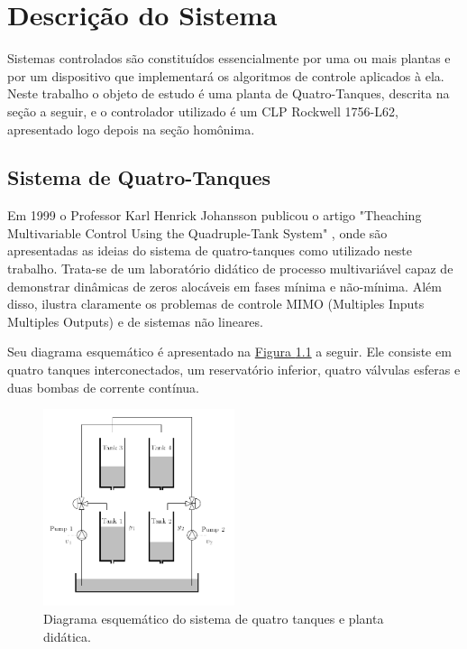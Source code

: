 %

\chapter{Descrição do Sistema} \label{capDescSis}
Sistemas controlados são constituídos essencialmente por uma ou mais plantas e por um dispositivo que implementará os algoritmos de controle aplicados à ela. Neste trabalho o objeto de estudo é uma planta de Quatro-Tanques, descrita na seção a seguir, e o controlador utilizado é um CLP Rockwell 1756-L62, apresentado logo depois na seção homônima.

\section{Sistema de Quatro-Tanques}
Em 1999 o Professor Karl Henrick Johansson publicou o artigo "Theaching Multivariable Control Using the Quadruple-Tank System" \cite{johansson2}, onde são apresentadas as ideias do sistema de quatro-tanques como utilizado neste trabalho. Trata-se de um laboratório didático de processo multivariável capaz de demonstrar dinâmicas de zeros alocáveis em fases mínima e não-mínima. Além disso, ilustra claramente os problemas de controle MIMO (Multiples Inputs Multiples Outputs) e de sistemas não lineares.

Seu diagrama esquemático é apresentado na  \hyperref[figDesc4tank]{Figura \ref{figDesc4tank}} a seguir. Ele consiste em quatro tanques interconectados, um reservatório inferior, quatro válvulas esferas e duas bombas de corrente contínua.

\begin{figure}[H]
	\centering
	\includegraphics[width=0.5\textwidth]{img/4tank.png}
	\caption{\label{figDesc4tank}Diagrama esquemático do sistema de quatro tanques e planta didática.}
\end{figure}

